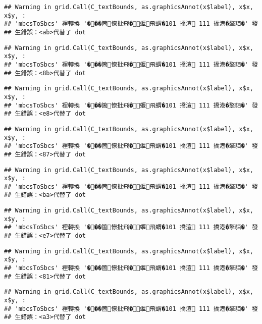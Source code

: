 \documentclass[
]{article}
\begin{document}
\begin{verbatim}
## Warning in grid.Call(C_textBounds, as.graphicsAnnot(x$label), x$x, x$y, :
## 'mbcsToSbcs' 裡轉換 '���箇憭批飛�蝘飛蝟�101 撟渲 111 撟港�摮貊�' 發
## 生錯誤：<ab>代替了 dot
\end{verbatim}

\begin{verbatim}
## Warning in grid.Call(C_textBounds, as.graphicsAnnot(x$label), x$x, x$y, :
## 'mbcsToSbcs' 裡轉換 '���箇憭批飛�蝘飛蝟�101 撟渲 111 撟港�摮貊�' 發
## 生錯誤：<8b>代替了 dot
\end{verbatim}

\begin{verbatim}
## Warning in grid.Call(C_textBounds, as.graphicsAnnot(x$label), x$x, x$y, :
## 'mbcsToSbcs' 裡轉換 '���箇憭批飛�蝘飛蝟�101 撟渲 111 撟港�摮貊�' 發
## 生錯誤：<e8>代替了 dot
\end{verbatim}

\begin{verbatim}
## Warning in grid.Call(C_textBounds, as.graphicsAnnot(x$label), x$x, x$y, :
## 'mbcsToSbcs' 裡轉換 '���箇憭批飛�蝘飛蝟�101 撟渲 111 撟港�摮貊�' 發
## 生錯誤：<87>代替了 dot
\end{verbatim}

\begin{verbatim}
## Warning in grid.Call(C_textBounds, as.graphicsAnnot(x$label), x$x, x$y, :
## 'mbcsToSbcs' 裡轉換 '���箇憭批飛�蝘飛蝟�101 撟渲 111 撟港�摮貊�' 發
## 生錯誤：<ba>代替了 dot
\end{verbatim}

\begin{verbatim}
## Warning in grid.Call(C_textBounds, as.graphicsAnnot(x$label), x$x, x$y, :
## 'mbcsToSbcs' 裡轉換 '���箇憭批飛�蝘飛蝟�101 撟渲 111 撟港�摮貊�' 發
## 生錯誤：<e7>代替了 dot
\end{verbatim}

\begin{verbatim}
## Warning in grid.Call(C_textBounds, as.graphicsAnnot(x$label), x$x, x$y, :
## 'mbcsToSbcs' 裡轉換 '���箇憭批飛�蝘飛蝟�101 撟渲 111 撟港�摮貊�' 發
## 生錯誤：<81>代替了 dot
\end{verbatim}

\begin{verbatim}
## Warning in grid.Call(C_textBounds, as.graphicsAnnot(x$label), x$x, x$y, :
## 'mbcsToSbcs' 裡轉換 '���箇憭批飛�蝘飛蝟�101 撟渲 111 撟港�摮貊�' 發
## 生錯誤：<a3>代替了 dot
\end{verbatim}
\end{document}

